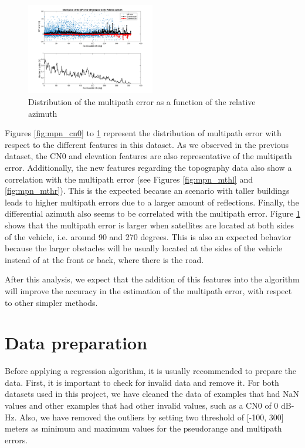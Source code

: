 \documentclass[a4paper, report, oneside, UKenglish]{memoir}
\begin{document}
\begin{figure}[ht]
    \centering
    \includegraphics[width=0.5\textwidth]{data-analysis/mpn_daz.png}
    \caption{Distribution of the multipath error as a function of the relative azimuth}
    \label{fig:mpn_daz}
\end{figure}

Figures \ref{fig:mpn_cn0} to \ref{fig:mpn_daz} represent the distribution of multipath error with respect to the different features in this dataset. As we observed in the previous dataset, the CN0 and elevation features are also representative of the multipath error. Additionally, the new features regarding the topography data also show a correlation with the multipath error (see Figures  \ref{fig:mpn_mthl} and \ref{fig:mpn_mthr}). This is the expected because an scenario with taller buildings leads to higher multipath errors due to a larger amount of reflections. Finally, the differential azimuth also seems to be correlated with the multipath error. Figure \ref{fig:mpn_daz} shows that the multipath error is larger when satellites are located at both sides of the vehicle, i.e. around 90 and 270 degrees. This is also an expected behavior because the larger obstacles will be usually located at the sides of the vehicle instead of at the front or back, where there is the road.

After this analysis, we expect that the addition of this features into the algorithm will improve the accuracy in the estimation of the multipath error, with respect to other simpler methods.



\section{Data preparation}\label{DataPrep}
Before applying a regression algorithm, it is usually recommended to prepare the data. First, it is important to check for invalid data and remove it. For both datasets used in this project, we have cleaned the data of examples that had NaN values and other examples that had other invalid values, such as a CN0 of 0 dB-Hz. Also, we have removed the outliers by setting two threshold of [-100, 300] meters as minimum and maximum values for the pseudorange and multipath errors.
\end{document}
